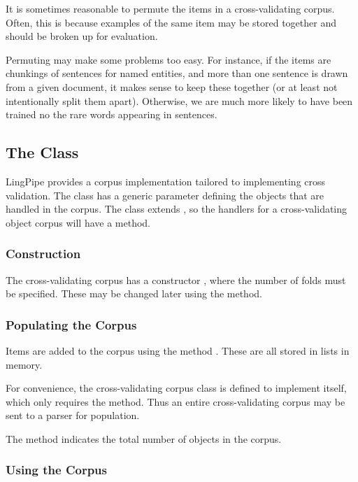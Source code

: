 It is sometimes reasonable to permute the items in a cross-validating
corpus.  Often, this is because examples of the same item may be
stored together and should be broken up for evaluation.  

Permuting may make some problems too easy.  For instance, if the items
are chunkings of sentences for named entities, and more than one
sentence is drawn from a given document, it makes sense to keep these
together (or at least not intentionally split them apart).  Otherwise,
we are much more likely to have been trained no the rare words
appearing in sentences.

\subsection{The  Class}

LingPipe provides a corpus implementation tailored to implementing
cross validation.  The class  has
a generic parameter  defining the objects that are handled in
the corpus.  The class extends , so the
handlers for a cross-validating object corpus will have a
 method.

\subsubsection{Construction}

The cross-validating corpus has a constructor
, where the number of folds
must be specified.  These may be changed later using the
 method.

\subsubsection{Populating the Corpus}

Items are added to the corpus using the method .
These are all stored in lists in memory.  

For convenience, the cross-validating corpus class is defined to
implement  itself, which only requires the
 method.  Thus an entire cross-validating corpus may
be sent to a parser for population.

The  method indicates the total number of objects in the
corpus.

\subsubsection{Using the Corpus}

